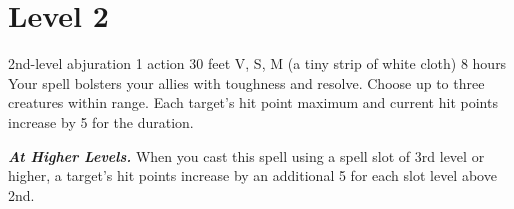 \documentclass[10pt,twoside,twocolumn,openany]{book}
\begin{document}
\newpage
\section{Level 2}
{2nd-level abjuration}
{\color{action}1 action}
{30 feet}
{V, S, M (a tiny strip of white cloth)}
{8 hours}
%
Your spell bolsters your allies with toughness and resolve. Choose up to three creatures within range. Each target's hit point maximum and current hit points increase by 5 for the duration.

\textbf{\textit{At Higher Levels.}} When you cast this spell using
a spell slot of 3rd level or higher, a target's hit points increase by an additional 5 for each slot level above 2nd.

\newpage
\printindex
\printindex[cr]
\end{document}
